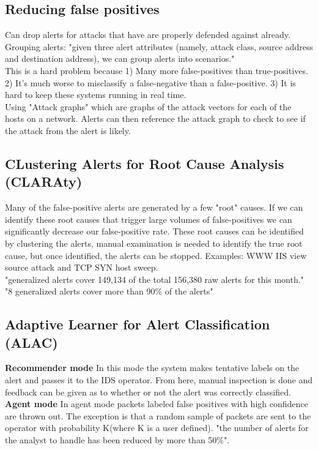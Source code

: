 \documentclass{article}
\begin{document}
\subsection*{Reducing false positives}
Can drop alerts for attacks that have are properly defended against already.\\
Grouping alerts: "given three alert attributes (namely, attack class, source address and destination address), we can group alerts into scenarios."\\
This is a hard problem because 1) Many more false-positives than true-positives. 2) It's much worse to misclassify a false-negative than a false-positive. 3) It is hard to keep these systems running in real time.\\
Using "Attack graphs" which are graphs of the attack vectors for each of the hosts on a network. Alerts can then reference the attack graph to check to see if the attack from the alert is likely.\\
\subsection*{CLustering Alerts for Root Cause Analysis (CLARAty)}
Many of the false-positive alerts are generated by a few "root" causes. If we can identify these root causes that trigger large volumes of false-positives we can significantly decrease our false-positive rate. These root causes can be identified by clustering the alerts, manual examination is needed to identify the true root cause, but once identified, the alerts can be stopped. Examples: WWW IIS view source attack and TCP SYN host sweep.\\
"generalized alerts cover 149,134 of the total 156,380 raw alerts for this month."\\
"8 generalized alerts cover more than 90\% of the alerts"\\
\subsection*{Adaptive Learner for Alert Classification (ALAC)}
\textbf{Recommender mode} In this mode the system makes tentative labels on the alert and passes it to the IDS operator. From here, manual inspection is done and feedback can be given as to whether or not the alert was correctly classified.\\
\textbf{Agent mode} In agent mode packets labeled false positives with high confidence are thrown out. The exception is that a random sample of packets are sent to the operator with probability K(where K is a user defined).
"the number of alerts for the analyst to handle has been reduced by more than 50\%".\\
\end{document}
